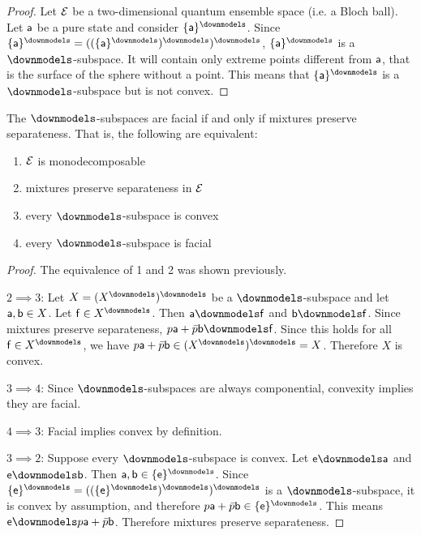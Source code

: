 \begin{mathSection}
	\begin{proof}
		Let $\Ens$ be a two-dimensional quantum ensemble space (i.e. a Bloch ball). Let $\ens[a]$ be a pure state and consider $\{ \ens[a]\}^\separate$. Since $\{\ens[a]\}^\separate = ((\{\ens[a]\}^\separate)^\separate)^\separate$, $\{ \ens[a]\}^\separate$ is a $\separate$-subspace. It will contain only extreme points different from $\ens[a]$, that is the surface of the sphere without a point. This means that $\{ \ens[a]\}^\separate$ is a $\separate$-subspace but is not convex.
	\end{proof}
	
	\begin{coro}
		The $\separate$-subspaces are facial if and only if mixtures preserve separateness. That is, the following are equivalent:
		\begin{enumerate}
			\item $\Ens$ is monodecomposable
			\item mixtures preserve separateness in $\Ens$
			\item every $\separate$-subspace is convex
			\item every $\separate$-subspace is facial
		\end{enumerate}
	\end{coro}
	
	\begin{proof}
		The equivalence of 1 and 2 was shown previously. 
		
		$2 \implies 3$: Let $X = (X^\separate)^\separate$ be a $\separate$-subspace and let $\ens[a], \ens[b] \in X$. Let $\ens[f] \in X^\separate$. Then $\ens[a] \separate \ens[f]$ and $\ens[b] \separate \ens[f]$. Since mixtures preserve separateness, $p\ens[a] + \bar{p}\ens[b] \separate \ens[f]$. Since this holds for all $\ens[f] \in X^\separate$, we have $p\ens[a] + \bar{p}\ens[b] \in (X^\separate)^\separate = X$. Therefore $X$ is convex.
		
		$3 \implies 4$: Since $\separate$-subspaces are always componential, convexity implies they are facial.
		
		$4 \implies 3$: Facial implies convex by definition.
		
		$3 \implies 2$: Suppose every $\separate$-subspace is convex. Let $\ens \separate \ens[a]$ and $\ens \separate \ens[b]$. Then $\ens[a], \ens[b] \in \{\ens\}^\separate$. Since $\{\ens\}^\separate = ((\{\ens\}^\separate)^\separate)^\separate$ is a $\separate$-subspace, it is convex by assumption, and therefore $p\ens[a] + \bar{p}\ens[b] \in \{\ens\}^\separate$. This means $\ens \separate p\ens[a] + \bar{p}\ens[b]$. Therefore mixtures preserve separateness.
	\end{proof}
\end{mathSection}

